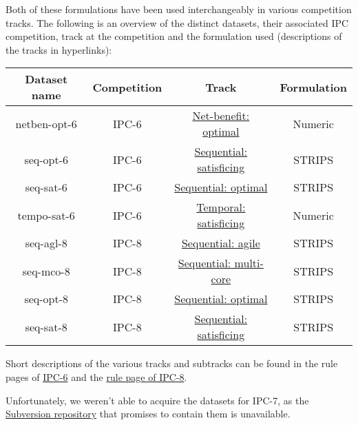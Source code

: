\documentclass[10pt,a4paper,oneside]{article}
\begin{document}
Both of these formulations have been used interchangeably in various competition tracks.
The following is an overview of the distinct datasets, their associated IPC competition, track at the competition and the formulation used (descriptions of the tracks in hyperlinks):

\begin{center}
\begin{tabular}{c|c|c|c}
\textbf{Dataset name} & \textbf{Competition} & \textbf{Track} & \textbf{Formulation} \\ 
\hline
\hline
netben-opt-6 & IPC-6 & \href{http://icaps-conference.org/ipc2008/deterministic/NetBenefitOptimization.html}{Net-benefit: optimal} & Numeric \\ 
seq-opt-6 & IPC-6 & \href{http://icaps-conference.org/ipc2008/deterministic/SequentialSatisficing.html}{Sequential: satisficing} & STRIPS \\ 
seq-sat-6 & IPC-6 & \href{http://icaps-conference.org/ipc2008/deterministic/SequentialOptimization.html}{Sequential: optimal} & STRIPS \\ 
tempo-sat-6 & IPC-6 & \href{http://icaps-conference.org/ipc2008/deterministic/TemporalSatisficing.html}{Temporal: satisficing} & Numeric \\ 
\hline
seq-agl-8 & IPC-8 & \href{https://helios.hud.ac.uk/scommv/IPC-14/seqagi.html}{Sequential: agile} & STRIPS \\ 
seq-mco-8 & IPC-8 & \href{https://helios.hud.ac.uk/scommv/IPC-14/seqmulti.html}{Sequential: multi-core} & STRIPS \\ 
seq-opt-8 & IPC-8 & \href{https://helios.hud.ac.uk/scommv/IPC-14/seqopt.html}{Sequential: optimal} & STRIPS \\ 
seq-sat-8 & IPC-8 & \href{https://helios.hud.ac.uk/scommv/IPC-14/seqsat.html}{Sequential: satisficing} & STRIPS \\ 
\end{tabular} 
\end{center}

Short descriptions of the various tracks and subtracks can be found in the rule pages of
\href{https://helios.hud.ac.uk/scommv/IPC-14/rules.html}{IPC-6}
and the  \href{http://icaps-conference.org/ipc2008/deterministic/CompetitionRules.html}{rule page of IPC-8}.

Unfortunately, we weren't able to acquire the datasets for IPC-7, as the \href{http://www.plg.inf.uc3m.es/ipc2011-deterministic/Domains.html}{Subversion repository} that promises to contain them is unavailable.
\end{document}
